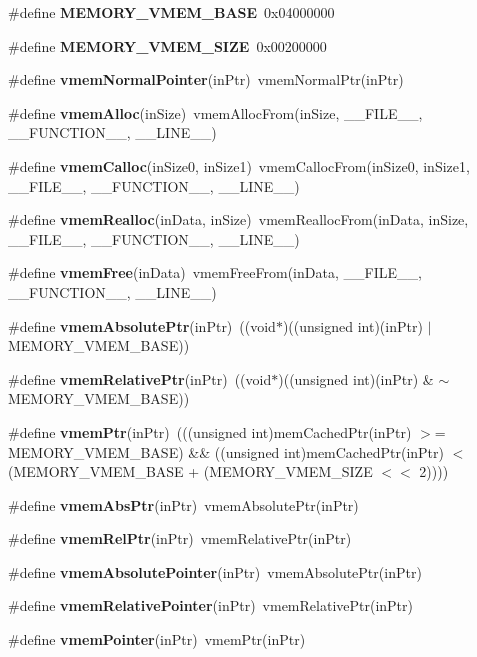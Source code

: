 \begin{CompactItemize}
\item 
\#define {\bf MEMORY\_\-VMEM\_\-BASE}~0x04000000
\item 
\#define {\bf MEMORY\_\-VMEM\_\-SIZE}~0x00200000
\item 
\#define {\bf vmem\-Normal\-Pointer}(in\-Ptr)~vmem\-Normal\-Ptr(in\-Ptr)
\item 
\#define {\bf vmem\-Alloc}(in\-Size)~vmem\-Alloc\-From(in\-Size, \_\-\_\-FILE\_\-\_\-, \_\-\_\-FUNCTION\_\-\_\-, \_\-\_\-LINE\_\-\_\-)
\item 
\#define {\bf vmem\-Calloc}(in\-Size0, in\-Size1)~vmem\-Calloc\-From(in\-Size0, in\-Size1, \_\-\_\-FILE\_\-\_\-, \_\-\_\-FUNCTION\_\-\_\-, \_\-\_\-LINE\_\-\_\-)
\item 
\#define {\bf vmem\-Realloc}(in\-Data, in\-Size)~vmem\-Realloc\-From(in\-Data, in\-Size, \_\-\_\-FILE\_\-\_\-, \_\-\_\-FUNCTION\_\-\_\-, \_\-\_\-LINE\_\-\_\-)
\item 
\#define {\bf vmem\-Free}(in\-Data)~vmem\-Free\-From(in\-Data, \_\-\_\-FILE\_\-\_\-, \_\-\_\-FUNCTION\_\-\_\-, \_\-\_\-LINE\_\-\_\-)
\item 
\#define {\bf vmem\-Absolute\-Ptr}(in\-Ptr)~((void$\ast$)((unsigned int)(in\-Ptr) $|$ MEMORY\_\-VMEM\_\-BASE))
\item 
\#define {\bf vmem\-Relative\-Ptr}(in\-Ptr)~((void$\ast$)((unsigned int)(in\-Ptr) \& $\sim$MEMORY\_\-VMEM\_\-BASE))
\item 
\#define {\bf vmem\-Ptr}(in\-Ptr)~(((unsigned int)mem\-Cached\-Ptr(in\-Ptr) $>$= MEMORY\_\-VMEM\_\-BASE) \&\& ((unsigned int)mem\-Cached\-Ptr(in\-Ptr) $<$ (MEMORY\_\-VMEM\_\-BASE + (MEMORY\_\-VMEM\_\-SIZE $<$$<$ 2))))
\item 
\#define {\bf vmem\-Abs\-Ptr}(in\-Ptr)~vmem\-Absolute\-Ptr(in\-Ptr)
\item 
\#define {\bf vmem\-Rel\-Ptr}(in\-Ptr)~vmem\-Relative\-Ptr(in\-Ptr)
\item 
\#define {\bf vmem\-Absolute\-Pointer}(in\-Ptr)~vmem\-Absolute\-Ptr(in\-Ptr)
\item 
\#define {\bf vmem\-Relative\-Pointer}(in\-Ptr)~vmem\-Relative\-Ptr(in\-Ptr)
\item 
\#define {\bf vmem\-Pointer}(in\-Ptr)~vmem\-Ptr(in\-Ptr)
\end{CompactItemize}
